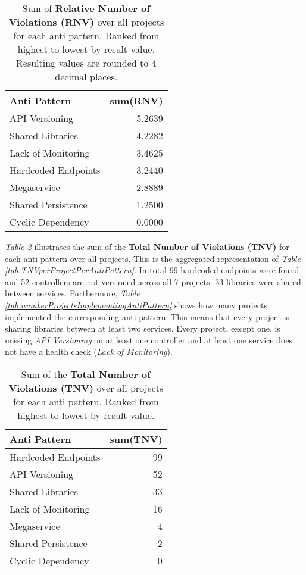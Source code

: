\documentclass{article}
\begin{document}
\begin{table}[h!]
\begin{center}
\begin{tabular}{|l|r|}
\hline
Anti Pattern        & \multicolumn{1}{l|}{sum(RNV)} \\ \hline \hline
API Versioning      & 5.2639 \\ \hline
Shared Libraries    & 4.2282 \\ \hline
Lack of Monitoring  & 3.4625 \\ \hline
Hardcoded Endpoints & 3.2440 \\ \hline
Megaservice         & 2.8889 \\ \hline
Shared Persistence  & 1.2500 \\ \hline
Cyclic Dependency   & 0.0000 \\ \hline
\end{tabular}
\caption{Sum of \textbf{Relative Number of Violations (RNV)} over all projects for each anti pattern. Ranked from highest to lowest by result value. Resulting values are rounded to 4 decimal places.}
\label{tab:sumRNVperAntiPattern}
\end{center}
\end{table}

\textit{Table \ref{tab:sumTNVperAntiPattern}} illustrates the sum of the \textbf{Total Number of Violations (TNV)} for each anti pattern over all projects. This is the aggregated representation of \textit{Table \ref{tab:TNVperProjectPerAntiPattern}}. In total 99 hardcoded endpoints were found and 52 controllers are not versioned across all 7 projects. 33 libraries were shared between services. Furthermore, \textit{Table \ref{tab:numberProjectsImplementingAntiPattern}} shows how many projects implemented the corresponding anti pattern. This means that every project is sharing libraries between at least two services. Every project, except one, is missing \textit{API Versioning} on at least one controller and at least one service does not have a health check (\textit{Lack of Monitoring}). \newline

\begin{table}[h!]
\begin{center}
\begin{tabular}{|l|r|}
\hline
Anti Pattern        & \multicolumn{1}{l|}{sum(TNV)} \\ \hline \hline
Hardcoded Endpoints & 99 \\ \hline
API Versioning      & 52 \\ \hline
Shared Libraries    & 33 \\ \hline
Lack of Monitoring  & 16 \\ \hline
Megaservice         & 4  \\ \hline
Shared Persistence  & 2  \\ \hline
Cyclic Dependency   & 0  \\ \hline
\end{tabular}
\caption{Sum of the \textbf{Total Number of Violations (TNV)} over all projects for each anti pattern. Ranked from highest to lowest by result value.}
\label{tab:sumTNVperAntiPattern}
\end{center}
\end{table}
\end{document}
